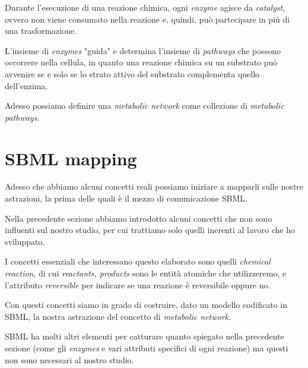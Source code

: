 Durante l'esecuzione di una reazione chimica, ogni \emph{enzyme}
agisce da \emph{catalyst}, ovvero non viene consumato nella reazione
e, quindi, pu\`o partecipare in pi\`u di una trasformazione.

L'insieme di \emph{enzymes} "guida" e determina l'insieme di
\emph{pathways} che possono occorrere nella cellula, in quanto una
reazione chimica su un substrato pu\`o avvenire se e solo se lo strato
attivo del substrato complementa quello dell'enzima.

Adesso possiamo definire una \emph{metabolic network} come
collezione di \emph{metabolic pathways}.

\section{SBML mapping}

Adesso che abbiamo alcuni concetti reali possiamo iniziare a mapparli
sulle nostre astrazioni, la prima delle quali \`e il mezzo di
comunicazione SBML.

Nella precedente sezione abbiamo introdotto alcuni concetti che non
sono influenti sul nostro studio, per cui trattiamo solo quelli
inerenti al lavoro che ho sviluppato.

I concetti essenziali che interessano questo elaborato sono quelli 
\emph{chemical reaction}, di cui \emph{reactants, products} sono le
entit\`a atomiche che utilizzeremo, e l'attributo \emph{reversible}
per indicare se una reazione \`e reversibile oppure no.

Con questi concetti siamo in grado di costruire, dato un modello
codificato in SBML, la nostra astrazione del concetto di
\emph{metabolic network}.

SBML ha molti altri elementi per catturare quanto spiegato nella
precedente sezione (come gli \emph{enzymes} e vari attributi specifici
di ogni reazione) ma questi non sono necessari al nostro studio.